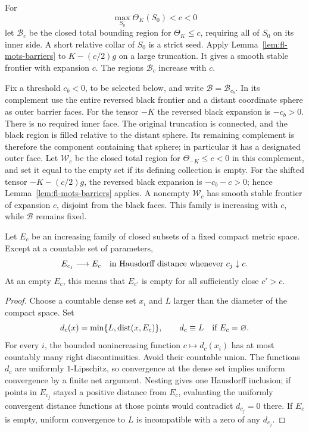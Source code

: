 For
\[
 \max_{S_0}\Theta_K(S_0)<c<0
\]
let \(\mathcal B_c\) be the closed total bounding region for
\(\Theta_K\le c\), requiring all of \(S_0\) on its inner side.
A short relative collar of \(S_0\) is a strict seed.  Apply
Lemma~\ref{lem:fl-mots-barriers} to \(K-(c/2)g\) on a large truncation.
It gives a smooth stable frontier with expansion \(c\).
The regions \(\mathcal B_c\) increase with \(c\).

Fix a threshold \(c_b<0\), to be selected below, and write
\(\mathcal B=\mathcal B_{c_b}\).
In its complement use the entire reversed black frontier and a distant
coordinate sphere as outer barrier faces.  For the tensor \(-K\) the
reversed black expansion is \(-c_b>0\).  There is no required inner face.
The original truncation is connected, and the black region is filled
relative to the distant sphere.  Its remaining complement is therefore
the component containing that sphere; in particular it has a designated
outer face.
Let \(\mathcal W_c\) be the closed total region for
\(\Theta_{-K}\le c<0\) in this complement, and set it equal to the empty
set if its defining collection is empty.  For the shifted tensor
\(-K-(c/2)g\), the reversed black expansion is \(-c_b-c>0\);
hence Lemma~\ref{lem:fl-mots-barriers} applies.  A nonempty
\(\mathcal W_c\) has smooth stable frontier of expansion \(c\), disjoint
from the black faces.  This family is increasing with \(c\), while
\(\mathcal B\) remains fixed.

\begin{lemma}
\label{lem:fl-right-continuity}
Let \(E_c\) be an increasing family of closed subsets of a fixed compact
metric space.  Except at a countable set of parameters,
\[
 E_{c_j}\longrightarrow E_c
 \quad\hbox{in Hausdorff distance whenever }c_j\downarrow c.
\]
At an empty \(E_c\), this means that \(E_{c'}\) is empty for all
sufficiently close \(c'>c\).
\end{lemma}

\begin{proof}
Choose a countable dense set \(x_i\) and \(L\) larger than the diameter
of the compact space.  Set
\[
 d_c(x)=\min\{L,\operatorname{dist}(x,E_c)\},
 \qquad d_c\equiv L\quad\hbox{if }E_c=\varnothing .
\]
For every \(i\), the bounded nonincreasing function \(c\mapsto d_c(x_i)\)
has at most countably many right discontinuities.  Avoid their
countable union.  The functions \(d_c\) are uniformly \(1\)-Lipschitz,
so convergence at the dense set implies uniform convergence by a finite
net argument.  Nesting gives one Hausdorff inclusion; if points in
\(E_{c_j}\) stayed a positive distance from \(E_c\), evaluating the
uniformly convergent distance functions at those points would contradict
\(d_{c_j}=0\) there.  If \(E_c\) is empty, uniform convergence to \(L\)
is incompatible with a zero of any \(d_{c_j}\).
\end{proof}

